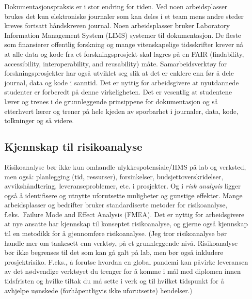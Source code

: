 \documentclass{article}
\begin{document}
Dokumentasjonspraksis er i stor endring for tiden. Ved noen arbeidsplasser brukes det kun elektroniske journaler som kan deles i et team mens andre steder kreves fortsatt håndskreven journal. Noen arbeidsplasser bruker Laboratory Information Management System (LIMS) systemer til dokumentasjon. De fleste som finansierer offentlig forskning og mange vitenskapelige tidsskrifter krever nå at alle data og kode fra et forskningsprosjekt skal lagres på en FAIR (findability, accessibility, interoperability, and reusability) måte. Samarbeidsverktøy for forskningsprosjekter har også utviklet seg slik at det er enklere enn før å dele journal, data og kode i sanntid. Det er nyttig for arbeidsgivere at nyutdannede studenter er forberedt på denne virkeligheten. Det er vesentlig at studentene lærer og trenes i de grunnleggende prinsippene for dokumentasjon og så etterhvert lærer og trener på hele kjeden av sporbarhet i journaler, data, kode, tolkninger og så videre.



\subsection{Kjennskap til risikoanalyse}
Risikoanalyse bør ikke kun omhandle ulykkespotensiale/HMS på lab og verksted, men også: planlegging (tid, ressurser), forsinkelser, budsjettoverskridelser,  avvikshåndtering, leveranseproblemer, etc. i prosjekter. Og i \emph{risk analysis} ligger også å identifisere og utnytte uforutsette muligheter og gunstige effekter. Mange arbeidsplasser og bedrifter bruker standardiserte metoder for risikoanalyse, f.eks.~Failure Mode and Effect Analysis (FMEA). Det er nyttig for arbeidsgivere at nye ansatte har kjennskap til konseptet risikoanalyse, og gjerne også kjennskap til en metodikk for å gjennomføre risikoanalyse. 
{\color{red}(Jeg tror risikoanalyse bør handle mer om tankesett enn verktøy, på et grunnleggende nivå.  Risikoanalyse bør ikke begrenses til det som kan gå galt på lab, men bør også inkludere prosjektrisiko. F.eks., å forutse hvordan en global pandemi kan påvirke leveransen av det nødvendige verktøyet du trenger for å komme i mål med diplomen innen tidsfristen og hvilke tiltak du må sette i verk og til hvilket tidspunkt for å avhjelpe uønskede (forhåpentligvis ikke uforutsette) hendelser.)}
\end{document}
